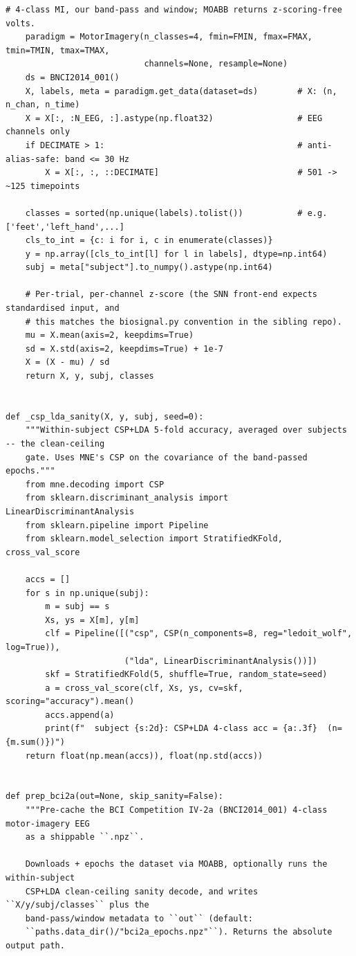 \begin{lstlisting}[caption={mnn\_torch/data.py},label={lst:mnn-src-data}]
    # 4-class MI, our band-pass and window; MOABB returns z-scoring-free volts.
    paradigm = MotorImagery(n_classes=4, fmin=FMIN, fmax=FMAX, tmin=TMIN, tmax=TMAX,
                            channels=None, resample=None)
    ds = BNCI2014_001()
    X, labels, meta = paradigm.get_data(dataset=ds)        # X: (n, n_chan, n_time)
    X = X[:, :N_EEG, :].astype(np.float32)                 # EEG channels only
    if DECIMATE > 1:                                       # anti-alias-safe: band <= 30 Hz
        X = X[:, :, ::DECIMATE]                            # 501 -> ~125 timepoints

    classes = sorted(np.unique(labels).tolist())           # e.g. ['feet','left_hand',...]
    cls_to_int = {c: i for i, c in enumerate(classes)}
    y = np.array([cls_to_int[l] for l in labels], dtype=np.int64)
    subj = meta["subject"].to_numpy().astype(np.int64)

    # Per-trial, per-channel z-score (the SNN front-end expects standardised input, and
    # this matches the biosignal.py convention in the sibling repo).
    mu = X.mean(axis=2, keepdims=True)
    sd = X.std(axis=2, keepdims=True) + 1e-7
    X = (X - mu) / sd
    return X, y, subj, classes


def _csp_lda_sanity(X, y, subj, seed=0):
    """Within-subject CSP+LDA 5-fold accuracy, averaged over subjects -- the clean-ceiling
    gate. Uses MNE's CSP on the covariance of the band-passed epochs."""
    from mne.decoding import CSP
    from sklearn.discriminant_analysis import LinearDiscriminantAnalysis
    from sklearn.pipeline import Pipeline
    from sklearn.model_selection import StratifiedKFold, cross_val_score

    accs = []
    for s in np.unique(subj):
        m = subj == s
        Xs, ys = X[m], y[m]
        clf = Pipeline([("csp", CSP(n_components=8, reg="ledoit_wolf", log=True)),
                        ("lda", LinearDiscriminantAnalysis())])
        skf = StratifiedKFold(5, shuffle=True, random_state=seed)
        a = cross_val_score(clf, Xs, ys, cv=skf, scoring="accuracy").mean()
        accs.append(a)
        print(f"  subject {s:2d}: CSP+LDA 4-class acc = {a:.3f}  (n={m.sum()})")
    return float(np.mean(accs)), float(np.std(accs))


def prep_bci2a(out=None, skip_sanity=False):
    """Pre-cache the BCI Competition IV-2a (BNCI2014_001) 4-class motor-imagery EEG
    as a shippable ``.npz``.

    Downloads + epochs the dataset via MOABB, optionally runs the within-subject
    CSP+LDA clean-ceiling sanity decode, and writes ``X/y/subj/classes`` plus the
    band-pass/window metadata to ``out`` (default:
    ``paths.data_dir()/"bci2a_epochs.npz"``). Returns the absolute output path.


\end{lstlisting}
